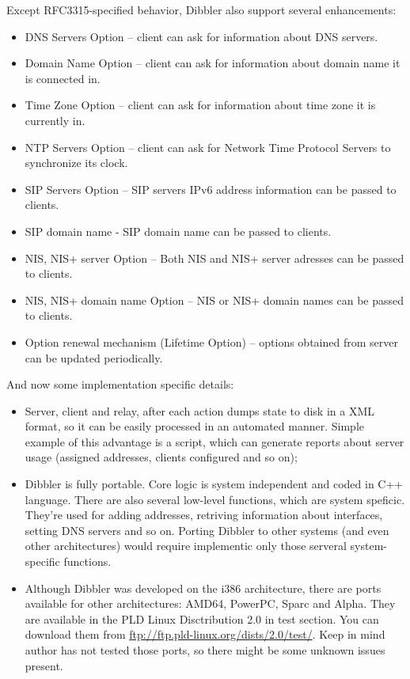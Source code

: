 Except RFC3315-specified behavior, Dibbler also support several enhancements:

\begin{itemize}
\item DNS Servers Option -- client can ask for information about DNS
  servers.
\item Domain Name Option -- client can ask for information about
  domain name it is connected in.
\item Time Zone Option -- client can ask for information about 
time zone it is currently in.
\item NTP Servers Option -- client can ask for Network Time Protocol
  Servers to synchronize its clock.
\item SIP Servers Option -- SIP servers IPv6 address information can
  be passed to clients.
\item SIP domain name - SIP domain name can be passed to clients.
\item NIS, NIS+ server Option -- Both NIS and NIS+ server adresses
  can be passed to clients.
\item NIS, NIS+ domain name Option -- NIS or NIS+ domain names can be
  passed to clients.
\item Option renewal mechanism (Lifetime Option) -- options obtained
  from server can be updated periodically.
\end{itemize}

And now some implementation specific details:
\begin{itemize}
\item Server, client and relay, after each action dumps state to disk
  in a XML format, so it can be easily processed in an automated
  manner. Simple example of this advantage is a script, which can generate
  reports about server usage (assigned addresses, clients configured
  and so on);
\item Dibbler is fully portable. Core logic is system independent and
  coded in C++ language. There are also several low-level functions,
  which are system speficic. They're used for adding addresses,
  retriving information about interfaces, setting DNS servers and so
  on. Porting Dibbler to other systems (and even other architectures)
  would require implementic only those serveral system-specific
  functions.
\item Although Dibbler was developed on the i386 architecture, there
  are ports available for other architectures: AMD64, PowerPC, Sparc and
  Alpha. They are available in the PLD Linux Disctribution 2.0 in test
  section. You can download them from
  \url{ftp://ftp.pld-linux.org/dists/2.0/test/}. Keep in mind author
  has not tested those ports, so there might be some unknown issues
  present.
\end{itemize}

